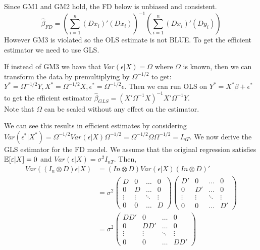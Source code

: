 \documentclass[DIV=14,titlepage=false]{scrreprt}
\begin{document}
Since GM1 and GM2 hold, the FD below is unbiased and consistent. 
\[
    \hat\beta_{FD} = \left(\sum_{i=1}^n (Dx_i)'(Dx_i)\right)^{-1} \left(\sum_{i=1}^n (Dx_i)'(Dy_i)\right)
\]
However GM3 is violated so the OLS estimate is not BLUE. To get the efficient estimator we need to use GLS.
\begin{definition}[GLS]
    If instead of GM3 we have that $Var(\epsilon|X) = \Omega$ where $\Omega$ is known, then we can transform the data by premultiplying by $\Omega^{-1/2}$ to get: $Y^* = \Omega^{-1/2}Y, X^* = \Omega^{-1/2}X, \epsilon^* = \Omega^{-1/2}\epsilon$. Then we can run OLS on $Y^* = X^* \beta + \epsilon^*$ to get the efficient estimator $\hat\beta_{GLS} = (X'\Omega^{-1}X)^{-1}X'\Omega^{-1}Y$.\\
    Note that $\Omega$ can be scaled without any effect on the estimator.
\end{definition}
We can see this results in efficient estimates by considering $Var(\epsilon^*|X^*) = \Omega^{-1/2}Var(\epsilon|X)\Omega^{-1/2} =\Omega^{-1/2}\Omega \Omega^{-1/2}= I_{nT}$. We now derive the GLS estimator for the FD model. We assume that the original regression satisfies $\mathbb{E}[\varepsilon|X]=0$ and $Var(\epsilon|X)=\sigma^2 I_{nT}$. Then,
\begin{align*}
    Var ((I_n \otimes D)\epsilon|X) &= (In \otimes D) Var(\epsilon|X) (In \otimes D)' \\
    &= \sigma^2 \begin{pmatrix}
        D & 0 & \hdots & 0 \\
        0 & D & \hdots & 0 \\
        \vdots & \vdots & \ddots & \vdots \\
        0 & 0 & \hdots & D  \end{pmatrix} 
        \begin{pmatrix}
            D' & 0 & \hdots & 0 \\
            0 & D' & \hdots & 0 \\
            \vdots & \vdots & \ddots & \vdots \\
            0 & 0 & \hdots & D'  \end{pmatrix} \\
    &= \sigma^2 \begin{pmatrix}
        DD' & 0 & \hdots & 0 \\
        0 & DD' & \hdots & 0 \\
        \vdots & \vdots & \ddots & \vdots \\
        0 & 0 & \hdots & DD'  \end{pmatrix} 
\end{align*}
\end{document}
